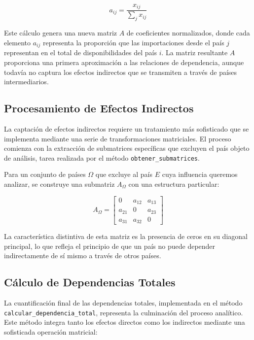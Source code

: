 \documentclass[authoryear]{elsarticle}
\begin{document}
\begin{equation}
a_{ij} = \frac{x_{ij}}{\sum_{j} x_{ij}}
\end{equation}

Este cálculo genera una nueva matriz $A$ de coeficientes normalizados, donde cada elemento $a_{ij}$ representa la proporción que las importaciones desde el país $j$ representan en el total de disponibilidades del país $i$. La matriz resultante $A$ proporciona una primera aproximación a las relaciones de dependencia, aunque todavía no captura los efectos indirectos que se transmiten a través de países intermediarios.

\subsection{Procesamiento de Efectos Indirectos}

La captación de efectos indirectos requiere un tratamiento más sofisticado que se implementa mediante una serie de transformaciones matriciales. El proceso comienza con la extracción de submatrices específicas que excluyen el país objeto de análisis, tarea realizada por el método \texttt{obtener\_submatrices}. 

Para un conjunto de países $\Omega$ que excluye al país $E$ cuya influencia queremos analizar, se construye una submatriz $A_{\Omega}$ con una estructura particular:

\begin{equation}
A_{\Omega} = 
\begin{bmatrix}
0 & a_{12} & a_{13} \\
a_{21} & 0 & a_{23} \\
a_{31} & a_{32} & 0
\end{bmatrix}
\end{equation}

La característica distintiva de esta matriz es la presencia de ceros en su diagonal principal, lo que refleja el principio de que un país no puede depender indirectamente de sí mismo a través de otros países.

\subsection{Cálculo de Dependencias Totales}

La cuantificación final de las dependencias totales, implementada en el método \texttt{calcular\_dependencia\_total}, representa la culminación del proceso analítico. Este método integra tanto los efectos directos como los indirectos mediante una sofisticada operación matricial:
\end{document}
